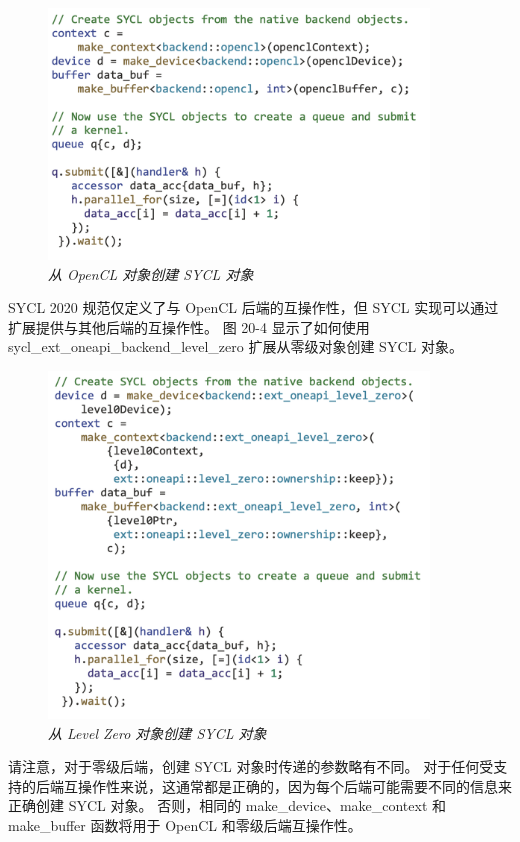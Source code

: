\begin{figure}[H]
	\centering
	\includegraphics[width=0.9\textwidth]{figs/F20.3.png}
	\caption{\textit{从 OpenCL 对象创建 SYCL 对象 }}
\end{figure}

SYCL 2020 规范仅定义了与 OpenCL 后端的互操作性，但 SYCL 实现可以通过扩展提供与其他后端的互操作性。 
图 20-4 显示了如何使用 sycl\_ext\_oneapi\_backend\_level\_zero 扩展从零级对象创建 SYCL 对象。

\begin{figure}[H]
	\centering
	\includegraphics[width=0.9\textwidth]{figs/F20.4.png}
	\caption{\textit{从 Level Zero 对象创建 SYCL 对象 }}
\end{figure}

请注意，对于零级后端，创建 SYCL 对象时传递的参数略有不同。 
对于任何受支持的后端互操作性来说，这通常都是正确的，因为每个后端可能需要不同的信息来正确创建 SYCL 对象。 
否则，相同的 make\_device、make\_context 和 make\_buffer 函数将用于 OpenCL 和零级后端互操作性。

